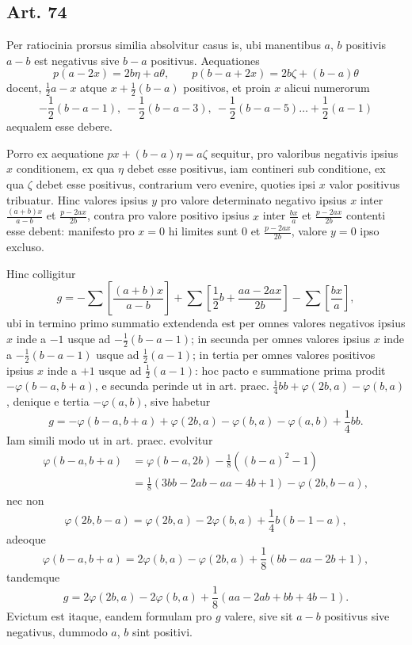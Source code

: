 \documentclass[12pt]{article}
\newcommand{\art}[1]{\subsection*{Art. #1}}
\newcommand{\gbrack}[1]{\left[#1\right]}
\begin{document}
\art{74}
Per ratiocinia prorsus similia absolvitur casus is, ubi manentibus $a$, $b$ positivis $a-b$ est negativus sive $b-a$ positivus. Aequationes
\[
p(a-2x)=2b\eta+a\theta,\qquad
p(b-a+2x)=2b\zeta+(b-a)\theta
\]
docent, $\frac12a-x$ atque $x+\frac12(b-a)$ positivos, et proin $x$ alicui numerorum
\[
-\frac12(b-a-1),\ -\frac12(b-a-3),\ -\frac12(b-a-5)\ldots+\frac12(a-1)
\]
aequalem esse debere.

Porro ex aequatione $px+(b-a)\eta=a\zeta$ sequitur, pro valoribus negativis ipsius $x$ conditionem, ex qua $\eta$ debet esse positivus, iam contineri sub conditione, ex qua $\zeta$ debet esse positivus, contrarium vero evenire, quoties ipsi $x$ valor positivus tribuatur. Hinc valores ipsius $y$ pro valore determinato negativo ipsius $x$ inter $\frac{(a+b)x}{a-b}$ et $\frac{p-2ax}{2b}$, contra pro valore positivo ipsius $x$ inter $\frac{bx}{a}$ et $\frac{p-2ax}{2b}$ contenti esse debent: manifesto pro $x=0$ hi limites sunt $0$ et $\frac{p-2ax}{2b}$, valore $y=0$ ipso excluso.

Hinc colligitur
\[
g=-\sum\gbrack{\frac{(a+b)x}{a-b}}
+\sum\gbrack{\frac12b+\frac{aa-2ax}{2b}}
-\sum\gbrack{\frac{bx}{a}},
\]
ubi in termino primo summatio extendenda est per omnes valores negativos ipsius $x$ inde a $-1$ usque ad $-\frac12(b-a-1)$; in secunda per omnes valores ipsius $x$ inde a $-\frac12(b-a-1)$ usque ad $\frac12(a-1)$; in tertia per omnes valores positivos ipsius $x$ inde a $+1$ usque ad $\frac12(a-1)$: hoc pacto e summatione prima prodit $-\varphi(b-a,b+a)$, e secunda perinde ut in art. praec. $\frac14bb+\varphi(2b,a)-\varphi(b,a)$, denique e tertia $-\varphi(a,b)$, sive habetur
\[
g=-\varphi(b-a,b+a)+\varphi(2b,a)-\varphi(b,a)-\varphi(a,b)+\frac14bb.
\]
Iam simili modo ut in art. praec. evolvitur
\[
\begin{aligned}
\varphi(b-a,b+a)
&=\varphi(b-a,2b)-\frac18((b-a)^2-1)\\
&=\frac18(3bb-2ab-aa-4b+1)-\varphi(2b,b-a),
\end{aligned}
\]
nec non
\[
\varphi(2b,b-a)=\varphi(2b,a)-2\varphi(b,a)+\frac14b(b-1-a),
\]
adeoque
\[
\varphi(b-a,b+a)=2\varphi(b,a)-\varphi(2b,a)+\frac18(bb-aa-2b+1),
\]
tandemque
\[
g=2\varphi(2b,a)-2\varphi(b,a)+\frac18(aa-2ab+bb+4b-1).
\]
Evictum est itaque, eandem formulam pro $g$ valere, sive sit $a-b$ positivus sive negativus, dummodo $a$, $b$ sint positivi.
\end{document}
